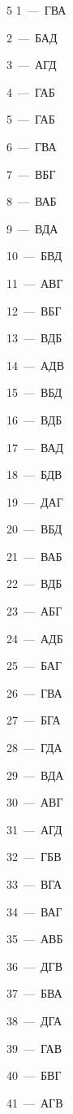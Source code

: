 \documentclass[12pt]{article}
\begin{document}
\begin{multicols}{5}\noindent
\mbox{1~--- ГВА}\par
\mbox{2~--- БАД}\par
\mbox{3~--- АГД}\par
\mbox{4~--- ГАБ}\par
\mbox{5~--- ГАБ}\par
\mbox{6~--- ГВА}\par
\mbox{7~--- ВБГ}\par
\mbox{8~--- ВАБ}\par
\mbox{9~--- ВДА}\par
\mbox{10~--- БВД}\par
\mbox{11~--- АВГ}\par
\mbox{12~--- ВБГ}\par
\mbox{13~--- ВДБ}\par
\mbox{14~--- АДВ}\par
\mbox{15~--- ВБД}\par
\mbox{16~--- ВДБ}\par
\mbox{17~--- ВАД}\par
\mbox{18~--- БДВ}\par
\mbox{19~--- ДАГ}\par
\mbox{20~--- ВБД}\par
\mbox{21~--- ВАБ}\par
\mbox{22~--- ВДБ}\par
\mbox{23~--- АБГ}\par
\mbox{24~--- АДБ}\par
\mbox{25~--- БАГ}\par
\mbox{26~--- ГВА}\par
\mbox{27~--- БГА}\par
\mbox{28~--- ГДА}\par
\mbox{29~--- ВДА}\par
\mbox{30~--- АВГ}\par
\mbox{31~--- АГД}\par
\mbox{32~--- ГБВ}\par
\mbox{33~--- ВГА}\par
\mbox{34~--- ВАГ}\par
\mbox{35~--- АВБ}\par
\mbox{36~--- ДГВ}\par
\mbox{37~--- БВА}\par
\mbox{38~--- ДГА}\par
\mbox{39~--- ГАВ}\par
\mbox{40~--- БВГ}\par
\mbox{41~--- АГВ}\par

\end{multicols}
\end{document}
